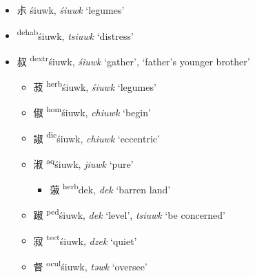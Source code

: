 \begin{itemize}
    \item {\Large{尗}} %
    {\large{śiuwk}},
    \textit{śiuwk} `legumes' %

  

    \item {\Large{}} %
    {\large{{\textsuperscript{dehab}}śiuwk}},
    \textit{tsiuwk} `distress' %
   
  \item {\Large{叔}} %
    {\large{{\textsuperscript{dextr}}śiuwk}},
    \textit{śiuwk} `gather', `father's younger brother' %

\vspace{-2mm}

\begin{itemize}
 \item {\Large{菽}} %
    {\large{{\textsuperscript{herb}}śiuwk}},
    \textit{śiuwk} `legumes' %



    \item {\Large{俶}} %
    {\large{{\textsuperscript{hom}}śiuwk}},
    \textit{chiuwk} `begin' %

    \item {\Large{諔}} %
    {\large{{\textsuperscript{dic}}śiuwk}},
    \textit{chiuwk} `eccentric' %

    \item {\Large{淑}} %
    {\large{{\textsuperscript{aq}}śiuwk}},
    \textit{jiuwk} `pure' %

    \begin{itemize}

 \item {\Large{蔋}} %
    {\large{{\textsuperscript{herb}}dek}},
    \textit{dek} `barren land' %

        
    \end{itemize}

    \item {\Large{踧}} %
    {\large{{\textsuperscript{ped}}śiuwk}},
    \textit{dek} `level', \textit{tsiuwk} `be concerned' %

    \item {\Large{寂}} %
    {\large{{\textsuperscript{tect}}śiuwk}},
    \textit{dzek} `quiet' %
    
    \item {\Large{督}} %
    {\large{{\textsuperscript{ocul}}śiuwk}},
    \textit{təwk} `oversee' %


\end{itemize}
\end{itemize}
